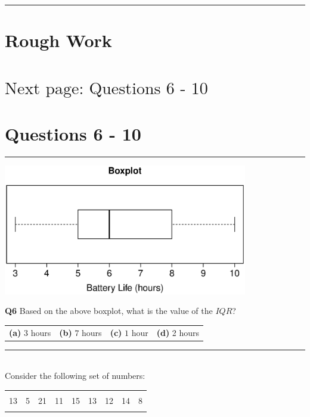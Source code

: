 \documentclass[12pt]{article}
\begin{document}
\quad

\rule{\linewidth}{1pt}

\newpage

\section*{Rough Work\\[23cm]}
\section*{\hspace{8cm}$\boxed{\text{Next page: Questions 6 - 10}}$}

\newpage


\section*{Questions 6 - 10}

\rule{\linewidth}{1pt}

\begin{center}
\includegraphics[width=0.8\textwidth, trim = 1.3cm 0.6cm 1cm 0.8cm, clip]{Boxplot}
\end{center}

{\bf Q6} Based on the above boxplot, what is the value of the $IQR$?\\[0.2cm]
\begin{tabular}{cccc}
{\bf(a)} $3$ hours & {\bf(b)} $7$ hours & {\bf(c)} $1$ hour & {\bf(d)} 2 hours \\[0.6cm]
\end{tabular}

\rule{\linewidth}{1pt}
\quad\\
Consider the following set of numbers:
\begin{center}
\begin{tabular}{|ccccccccc|}
\hline
&&&&&&&&\\[-0.4cm]
13 & 5 & 21 & 11 & 15 & 13 & 12 & 14 & 8 \\
\hline
\multicolumn{9}{c}{}
\end{tabular}
\end{center}
\end{document}
